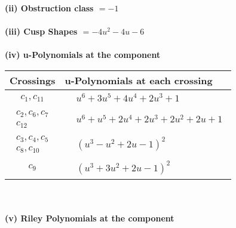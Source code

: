 \documentclass[1p]{elsarticle_modified}
\theoremstyle{definition}
\begin{document}
\flushleft \textbf{(ii) Obstruction class $= -1$}\\~\\
\flushleft \textbf{(iii) Cusp Shapes $= -4 u^2-4 u-6$}\\~\\
\newpage\renewcommand{\arraystretch}{1}
\flushleft \textbf{(iv) u-Polynomials at the component}\newline \\
\begin{tabular}{m{50pt}|m{274pt}}
Crossings & \hspace{64pt}u-Polynomials at each crossing \\
\hline $$\begin{aligned}c_{1},c_{11}\end{aligned}$$&$\begin{aligned}
&u^6+3 u^5+4 u^4+2 u^3+1
\end{aligned}$\\
\hline $$\begin{aligned}c_{2},c_{6},c_{7}\\c_{12}\end{aligned}$$&$\begin{aligned}
&u^6+u^5+2 u^4+2 u^3+2 u^2+2 u+1
\end{aligned}$\\
\hline $$\begin{aligned}c_{3},c_{4},c_{5}\\c_{8},c_{10}\end{aligned}$$&$\begin{aligned}
&(u^3- u^2+2 u-1)^2
\end{aligned}$\\
\hline $$\begin{aligned}c_{9}\end{aligned}$$&$\begin{aligned}
&(u^3+3 u^2+2 u-1)^2
\end{aligned}$\\
\hline
\end{tabular}\\~\\
\newpage\renewcommand{\arraystretch}{1}
\flushleft \textbf{(v) Riley Polynomials at the component}\newline \\
\end{document}
